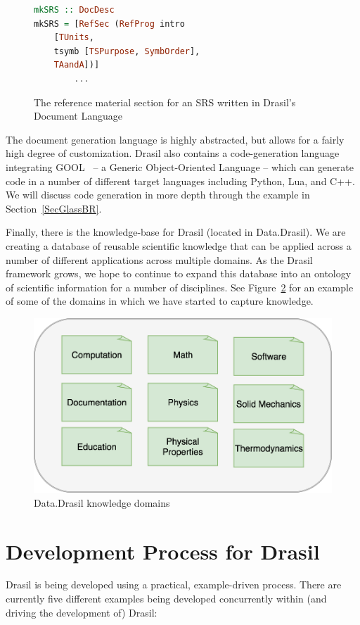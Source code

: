 \documentclass[sigconf]{acmart}
\begin{document}
\begin{figure}
\begin{lstlisting}[language=Haskell, frame=single, showstringspaces=false]
mkSRS :: DocDesc 
mkSRS = [RefSec (RefProg intro 
	[TUnits, 
	tsymb [TSPurpose, SymbOrder], 
	TAandA])]
        ...
\end{lstlisting}
\caption{The reference material section for an SRS written in Drasil's Document 
Language}
\label{recipeLang}
\end{figure}

The document generation language is highly abstracted, but allows for a fairly
high degree of customization. Drasil also contains a code-generation language
integrating GOOL~\cite{Costabile2012} -- a Generic Object-Oriented Language -- which can
generate code in a number of different target languages including Python, Lua,
and C++.  We will discuss code generation in more depth through the example in
Section~\ref{SecGlassBR}.

Finally, there is the knowledge-base for Drasil (located in Data.Drasil). We 
are creating a database of reusable scientific knowledge that can be applied 
across a number of different applications across multiple domains. As the 
Drasil framework grows, we hope to continue to expand this database into an 
ontology of scientific information for a number of disciplines. See 
Figure~\ref{ontology} for an example of some of the domains in which we have 
started to capture knowledge.

\begin{figure}
	\includegraphics[width=.5\textwidth]{figures/ontology.png}
	\caption{Data.Drasil knowledge domains}
	\label{ontology}
\end{figure}

\section{Development Process for Drasil} \label{SecDevProcess}

Drasil is being developed using a practical, example-driven process. There are 
currently five different examples being developed concurrently within (and 
driving the development of) Drasil:
\end{document}
